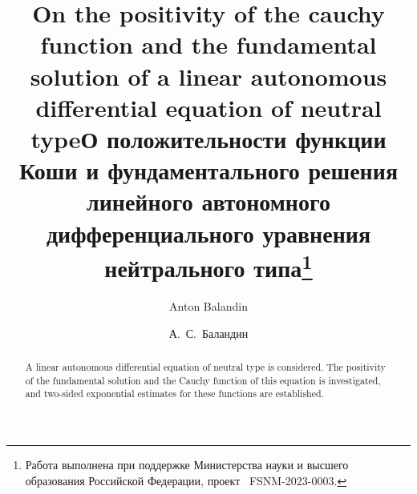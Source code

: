 \begin{englishtitle} %
\title{On the positivity of the cauchy function and the fundamental solution of a linear autonomous differential equation of neutral type}
\author{Anton Balandin
}

\maketitle

\begin{abstract}
A linear autonomous differential equation of neutral type is considered. The positivity of the fundamental solution and the Cauchy function of this equation is investigated, and two-sided exponential estimates for these functions are established.

\end{abstract}
\end{englishtitle}


\iffalse
\documentclass[12pt]{llncs}


\usepackage{iftex}

\ifPDFTeX
\usepackage[T2A]{fontenc}
\usepackage[utf8]{inputenc} %
\usepackage[english,russian]{babel}
\fi

\usepackage{todonotes}

\usepackage[russian]{nla}




\fi
%

\title{О положительности функции Коши и фундаментального решения линейного автономного дифференциального уравнения нейтрального типа\thanks{Работа выполнена при поддержке Министерства науки и высшего образования Российской Федерации, проект \textnumero~FSNM-2023-0003.}}
\author{А.~С.~Баландин %
} %

